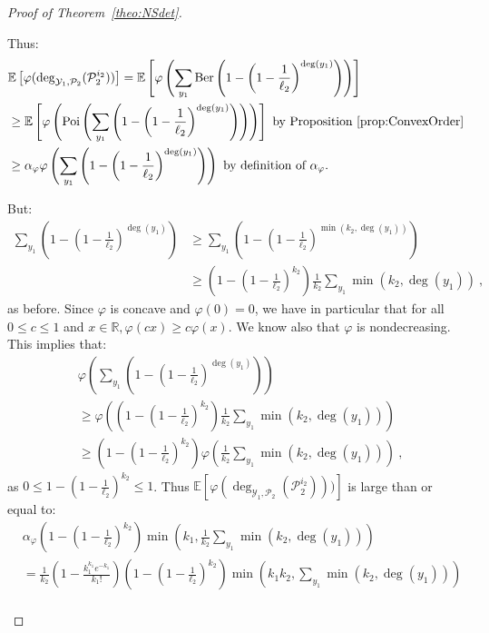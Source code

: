 \begin{proof}[Proof of Theorem~\ref{theo:NSdet}]
\begin{enumerate}
Thus:
\begin{equation}
  \begin{aligned}
    &\mathbb{E}\left[\varphi(\deg_{\mathcal{Y}_1,\mathcal{P}_2}(\mathcal{P}_2^{i_2}))\right] = \mathbb{E}\left[\varphi\left(\sum_{y_1}\operatorname{\text{Ber}}\left(1-\left(1-\frac{1}{\ell_2}\right)^{\deg(y_1)}\right)\right)\right]\\
    &\geq  \mathbb{E}\left[\varphi\left(\operatorname{\text{Poi}}\left(\sum_{y_1}\left(1-\left(1-\frac{1}{\ell_2}\right)^{\deg(y_1)}\right)\right)\right)\right] \text{ by Proposition~\ref{prop:ConvexOrder}}\\
    &\geq \alpha_{\varphi}\varphi\left(\sum_{y_1}\left(1-\left(1-\frac{1}{\ell_2}\right)^{\deg(y_1)}\right)\right) \text{ by definition of $\alpha_{\varphi}$.}
  \end{aligned}
\end{equation}

But:
\begin{equation}
  \begin{aligned}
    \sum_{y_1}\left(1-\left(1-\frac{1}{\ell_2}\right)^{\deg(y_1)}\right) &\geq \sum_{y_1}\left(1-\left(1-\frac{1}{\ell_2}\right)^{\min\left(k_2,\deg(y_1)\right)}\right)\\
    &\geq \left(1-\left(1-\frac{1}{\ell_2}\right)^{k_2}\right)\frac{1}{k_2}\sum_{y_1}\min\left(k_2,\deg(y_1)\right) \ ,
  \end{aligned}
\end{equation}
as before. Since $\varphi$ is concave and $\varphi(0)=0$, we have in particular that for all $0 \leq c \leq 1$ and $x \in \mathbb{R}, \varphi(cx)\geq c\varphi(x)$. We know also that $\varphi$ is nondecreasing. This implies that:
\begin{equation}
  \begin{aligned}
    &\varphi\left(\sum_{y_1}\left(1-\left(1-\frac{1}{\ell_2}\right)^{\deg(y_1)}\right)\right)\\
    &\geq \varphi\left(\left(1-\left(1-\frac{1}{\ell_2}\right)^{k_2}\right)\frac{1}{k_2}\sum_{y_1}\min\left(k_2,\deg(y_1)\right)\right) \\
&\geq \left(1-\left(1-\frac{1}{\ell_2}\right)^{k_2}\right)\varphi\left(\frac{1}{k_2}\sum_{y_1}\min\left(k_2,\deg(y_1)\right)\right) \ ,
  \end{aligned}
\end{equation}
as $0 \leq 1-\left(1-\frac{1}{\ell_2}\right)^{k_2} \leq 1$. Thus $\mathbb{E}\left[\varphi(\deg_{\mathcal{Y}_1,\mathcal{P}_2}(\mathcal{P}_2^{i_2})))\right]$ is large than or equal to:
\begin{equation}
  \begin{aligned}
    &\alpha_{\varphi}\left(1-\left(1-\frac{1}{\ell_2}\right)^{k_2}\right)\min\left(k_1,\frac{1}{k_2}\sum_{y_1}\min\left(k_2,\deg(y_1)\right)\right)\\
    &= \frac{1}{k_2}\left(1 - \frac{k_1^{k_1}e^{-k_1}}{k_1!}\right)\left(1-\left(1-\frac{1}{\ell_2}\right)^{k_2}\right)\min\left(k_1k_2,\sum_{y_1}\min\left(k_2,\deg(y_1)\right)\right)\\
  \end{aligned}
\end{equation}


\end{enumerate}
\end{proof}
